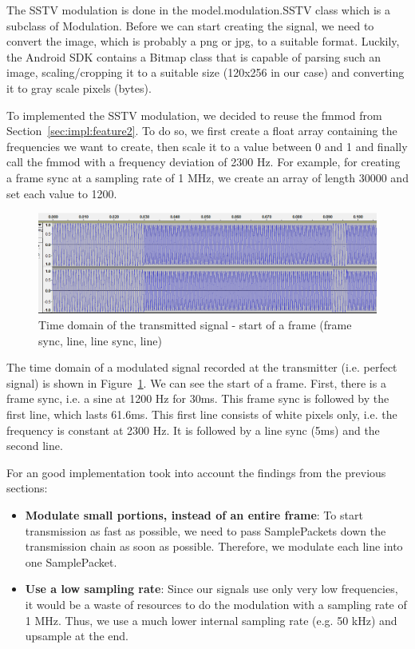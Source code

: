The SSTV modulation is done in the model.modulation.SSTV class which is a subclass of Modulation. Before we can start creating the signal, we need to convert the image, which is probably a png or jpg, to a suitable format. Luckily, the Android SDK contains a Bitmap class that is capable of parsing such an image, scaling/cropping it to a suitable size (120x256 in our case) and converting it to gray scale pixels (bytes). 

To implemented the SSTV modulation, we decided to reuse the fmmod from Section~\ref{sec:impl:feature2}. To do so, we first create a float array containing the frequencies we want to create, then scale it to a value between 0 and 1 and finally call the fmmod with a frequency deviation of 2300 Hz. For example, for creating a frame sync at a sampling rate of 1 MHz, we create an array of length 30000 and set each value to 1200. 

\begin{figure}
	\centering
	\includegraphics[width=1.0\linewidth]{gfx/sstv_timedomain.png}
	\caption{Time domain of the transmitted signal - start of a frame (frame sync, line, line sync, line) }
	\label{fig:impl:sstv:sstvtime}
\end{figure}

The time domain of a modulated signal recorded at the transmitter (i.e. perfect signal) is shown in Figure~\ref{fig:impl:sstv:sstvtime}. We can see the start of a frame. First, there is a frame sync, i.e. a sine at 1200 Hz for 30ms. This frame sync is followed by the first line, which lasts 61.6ms. This first line consists of white pixels only, i.e. the frequency is constant at 2300 Hz. It is followed by a line sync (5ms) and the second line. 

For an good implementation took into account the findings from the previous sections:
\begin{itemize}
	\item \textbf{Modulate small portions, instead of an entire frame}: To start transmission as fast as possible, we need to pass SamplePackets down the transmission chain as soon as possible. Therefore, we modulate each line into one SamplePacket. 
	\item \textbf{Use a low sampling rate}: Since our signals use only very low frequencies, it would be a waste of resources to do the modulation with a sampling rate of 1 MHz. Thus, we use a much lower internal sampling rate (e.g. 50 kHz) and upsample at the end.
\end{itemize}


